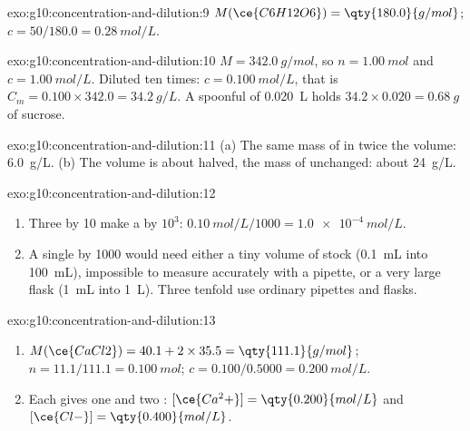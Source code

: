 \begin{solution}{exo:g10:concentration-and-dilution:9}
$M(\ce{C6H12O6}) = \qty{180.0}{g/mol}$; $c = 50 / 180.0 =
\qty{0.28}{mol/L}$.
\end{solution}

\begin{solution}{exo:g10:concentration-and-dilution:10}
$M = \qty{342.0}{g/mol}$, so $n = \qty{1.00}{mol}$ and $c =
\qty{1.00}{mol/L}$. Diluted ten times: $c = \qty{0.100}{mol/L}$, that is
$C_m = 0.100 \times 342.0 = \qty{34.2}{g/L}$. A spoonful of
\qty{0.020}{L} holds $34.2 \times 0.020 = \qty{0.68}{g}$ of sucrose.
\end{solution}

\begin{solution}{exo:g10:concentration-and-dilution:11}
(a) The same mass of  in twice the volume: \qty{6.0}{g/L}.
(b) The volume is about halved, the mass of  unchanged: about
\qty{24}{g/L}.
\end{solution}

\begin{solution}{exo:g10:concentration-and-dilution:12}
\begin{enumerate}
  \item Three  by 10 make a  by $10^3$:
        $\qty{0.10}{mol/L} / 1000 = \qty{1.0e-4}{mol/L}$.
  \item A single  by 1000 would need either a tiny volume of
        stock (\qty{0.1}{mL} into \qty{100}{mL}), impossible to measure
        accurately with a pipette, or a very large flask (\qty{1}{mL}
        into \qty{1}{L}). Three tenfold  use ordinary pipettes
        and flasks.
\end{enumerate}
\end{solution}

\begin{solution}{exo:g10:concentration-and-dilution:13}
\begin{enumerate}
  \item $M(\ce{CaCl2}) = 40.1 + 2 \times 35.5 = \qty{111.1}{g/mol}$;
        $n = 11.1 / 111.1 = \qty{0.100}{mol}$; $c = 0.100 / 0.5000 =
        \qty{0.200}{mol/L}$.
  \item Each  gives one  and two :
        $[\ce{Ca^2+}] = \qty{0.200}{mol/L}$ and $[\ce{Cl-}] =
        \qty{0.400}{mol/L}$.
\end{enumerate}
\end{solution}

